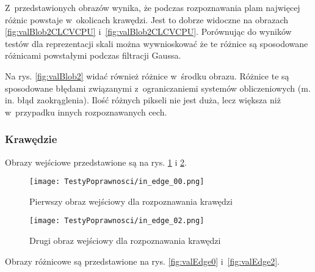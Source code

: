 Z~przedstawionych obrazów wynika, że podczas rozpoznawania plam najwięcej różnic powstaje w~okolicach krawędzi. Jest to dobrze widoczne na obrazach \ref{fig:valBlob2CLCVCPU} i~\ref{fig:valBlob2CLCVCPU}. Porównując do wyników testów dla reprezentacji skali można wywnioskować że te różnice są sposodowane różnicami powstałymi podczas filtracji Gaussa.

Na rys. \ref{fig:valBlob2} widać również różnice w~środku obrazu. Różnice te są sposodowane błędami związanymi z~ograniczaniemi systemów obliczeniowych (m. in. błąd zaokrąglenia). Ilość różnych pikseli nie jest duża, lecz większa niż w~przypadku innych rozpoznawanych cech.


\subsubsection{Krawędzie}
\label{subsubsec:krawedzieRysunki}

Obrazy wejściowe przedstawione są na rys. \ref{fig:valEdge00} i \ref{fig:valEdge02}.

\begin{figure}[h]
\begin{center}
\texttt{[image: TestyPoprawnosci/in\_edge\_00.png]}
\end{center}
\caption{Pierwszy obraz wejściowy dla rozpoznawania krawędzi}
\label{fig:valEdge00}
\end{figure}

\begin{figure}[h]
\begin{center}
\texttt{[image: TestyPoprawnosci/in\_edge\_02.png]}
\end{center}
\caption{Drugi obraz wejściowy dla rozpoznawania krawędzi}
\label{fig:valEdge02}
\end{figure}

Obrazy różnicowe są przedstawione na rys. \ref{fig:valEdge0} i~\ref{fig:valEdge2}. 

